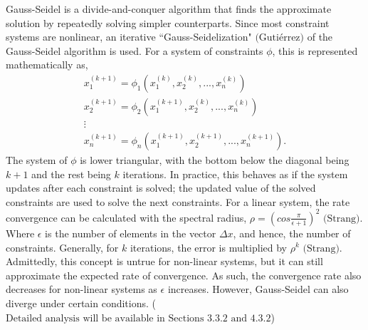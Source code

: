 \documentclass[12pt, letterpaper]{article}
\begin{document}
Gauss-Seidel is a divide-and-conquer algorithm that finds the approximate solution by repeatedly solving simpler counterparts. Since most constraint systems are nonlinear, an iterative ``Gauss-Seidelization" $\text{(Gutiérrez)}$ of the Gauss-Seidel algorithm is used. For a system of constraints $\phi$, this is represented mathematically as,
\begin{equation}
    \begin{gathered}
        x_{1} ^{(k + 1)} = \phi_{1}(x_{1}^{(k)},x_{2}^{(k)}, . . ., x_{n}^{(k)} )\\
        x_{2} ^{(k + 1)} = \phi_{2}(x_{1}^{(k + 1)},x_{2}^{(k)}, . . ., x_{n}^{(k)} )\\
        \vdots\\
        x_{n} ^{(k + 1)} = \phi_{n}(x_{1}^{(k + 1)},x_{2}^{(k + 1)}, . . ., x_{n}^{(k + 1)} ).
    \end{gathered}
\end{equation}
The system of $\phi$ is lower triangular, with the bottom below the diagonal being $k + 1$ and the rest being $k$ iterations. In practice, this behaves as if the system updates after each constraint is solved; the updated value of the solved constraints are used to solve the next constraints. For a linear system, the rate convergence can be calculated with the spectral radius, $\rho = (cos \frac{\pi}{\epsilon + 1})^{2}$ $\text{(Strang)}$. Where $\epsilon$ is the number of elements in the vector $\Delta x$, and hence, the number of constraints. Generally, for $k$ iterations, the error is multiplied by $\rho ^{k}$ $\text{(Strang)}$. Admittedly, this concept is untrue for non-linear systems, but it can still approximate the expected rate of convergence. As such, the convergence rate also decreases for non-linear systems as $\epsilon$ increases. However, Gauss-Seidel can also diverge under certain conditions. ($\text{Detailed analysis will be available in Sections 3.3.2 and 4.3.2}$)
\end{document}
